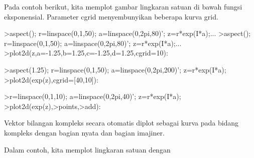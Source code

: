 \documentclass[a4paper,10pt]{article}
\begin{document}
\begin{eulernotebook}
\begin{eulercomment}
\begin{eulercomment}
\begin{eulercomment}
\begin{eulercomment}
\begin{eulercomment}
\begin{eulercomment}
\begin{eulercomment}
\begin{eulercomment}
\begin{eulercomment}
\begin{eulercomment}
\begin{eulercomment}
\begin{eulercomment}
\begin{eulercomment}
\begin{eulercomment}
\begin{eulercomment}
\begin{eulercomment}
\begin{eulercomment}
\begin{eulercomment}
\begin{eulercomment}
\begin{eulercomment}
\begin{eulercomment}
\begin{eulercomment}
\begin{eulercomment}
\begin{eulercomment}
\begin{eulercomment}
\begin{eulercomment}
\begin{eulercomment}
\begin{eulercomment}
\begin{eulercomment}
\begin{eulercomment}
\begin{eulercomment}
\begin{eulercomment}
\begin{eulercomment}
\begin{eulercomment}
\begin{eulercomment}
\begin{eulercomment}
\begin{eulercomment}
Pada contoh berikut, kita memplot gambar lingkaran satuan di bawah
fungsi eksponensial. Parameter cgrid menyembunyikan beberapa kurva
grid.
\end{eulercomment}
\begin{eulerprompt}
>aspect(); r=linspace(0,1,50); a=linspace(0,2pi,80)'; z=r*exp(I*a);...
>aspect(); r=linspace(0,1,50); a=linspace(0,2pi,80)'; z=r*exp(I*a);...
>plot2d(z,a=-1.25,b=1.25,c=-1.25,d=1.25,cgrid=10):
\end{eulerprompt}
\begin{eulerprompt}
>aspect(1.25); r=linspace(0,1,50); a=linspace(0,2pi,200)'; z=r*exp(I*a);
>plot2d(exp(z),cgrid=[40,10]):
\end{eulerprompt}
\begin{eulerprompt}
>r=linspace(0,1,10); a=linspace(0,2pi,40)'; z=r*exp(I*a);
>plot2d(exp(z),>points,>add):
\end{eulerprompt}
\begin{eulercomment}
Vektor bilangan kompleks secara otomatis diplot sebagai kurva pada
bidang kompleks dengan bagian nyata dan bagian imajiner.

Dalam contoh, kita memplot lingkaran satuan dengan


\end{eulercomment}
\end{eulercomment}
\end{eulercomment}
\end{eulercomment}
\end{eulercomment}
\end{eulercomment}
\end{eulercomment}
\end{eulercomment}
\end{eulercomment}
\end{eulercomment}
\end{eulercomment}
\end{eulercomment}
\end{eulercomment}
\end{eulercomment}
\end{eulercomment}
\end{eulercomment}
\end{eulercomment}
\end{eulercomment}
\end{eulercomment}
\end{eulercomment}
\end{eulercomment}
\end{eulercomment}
\end{eulercomment}
\end{eulercomment}
\end{eulercomment}
\end{eulercomment}
\end{eulercomment}
\end{eulercomment}
\end{eulercomment}
\end{eulercomment}
\end{eulercomment}
\end{eulercomment}
\end{eulercomment}
\end{eulercomment}
\end{eulercomment}
\end{eulercomment}
\end{eulercomment}
\end{eulernotebook}
\end{document}
